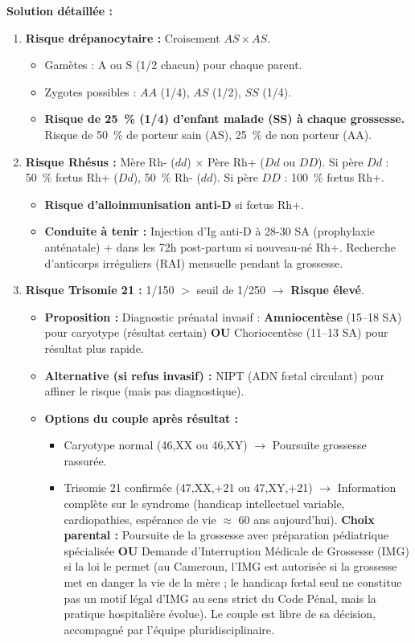 \documentclass[11pt]{article}
\begin{document}
\begin{exoresolu}
\textbf{Solution détaillée :}
\begin{enumerate}
    \item \textbf{Risque drépanocytaire :} Croisement $AS \times AS$.
    \begin{itemize}
        \item Gamètes : A ou S (1/2 chacun) pour chaque parent.
        \item Zygotes possibles : $AA$ (1/4), $AS$ (1/2), $SS$ (1/4).
        \item \textbf{Risque de \SI{25}{\%} (1/4) d'enfant malade (SS) à chaque grossesse.} Risque de \SI{50}{\%} de porteur sain (AS), \SI{25}{\%} de non porteur (AA).
    \end{itemize}
    \item \textbf{Risque Rhésus :} Mère Rh- ($dd$) $\times$ Père Rh+ ($Dd$ ou $DD$). Si père $Dd$ : \SI{50}{\%} fœtus Rh+ ($Dd$), \SI{50}{\%} Rh- ($dd$). Si père $DD$ : \SI{100}{\%} fœtus Rh+.
    \begin{itemize}
        \item \textbf{Risque d'alloinmunisation anti-D} si fœtus Rh+.
        \item \textbf{Conduite à tenir :} Injection d'Ig anti-D à \num{28}-\num{30} SA (prophylaxie anténatale) + dans les \num{72}h post-partum si nouveau-né Rh+. Recherche d'anticorps irréguliers (RAI) mensuelle pendant la grossesse.
    \end{itemize}
    \item \textbf{Risque Trisomie 21 :} 1/150 $>$ seuil de 1/250 $\rightarrow$ \textbf{Risque élevé}.
    \begin{itemize}
        \item \textbf{Proposition :} Diagnostic prénatal invasif : \textbf{Amniocentèse} (\num{15}--\num{18} SA) pour caryotype (résultat certain) \textbf{OU} Choriocentèse (\num{11}--\num{13} SA) pour résultat plus rapide.
        \item \textbf{Alternative (si refus invasif) :} NIPT (ADN fœtal circulant) pour affiner le risque (mais pas diagnostique).
        \item \textbf{Options du couple après résultat :}
        \begin{itemize}
            \item Caryotype normal (46,XX ou 46,XY) $\rightarrow$ Poursuite grossesse rassurée.
            \item Trisomie 21 confirmée (47,XX,+21 ou 47,XY,+21) $\rightarrow$ Information complète sur le syndrome (handicap intellectuel variable, cardiopathies, espérance de vie $\approx$ \num{60} ans aujourd'hui). \textbf{Choix parental :} Poursuite de la grossesse avec préparation pédiatrique spécialisée \textbf{OU} Demande d'Interruption Médicale de Grossesse (IMG) si la loi le permet (au Cameroun, l'IMG est autorisée si la grossesse met en danger la vie de la mère ; le handicap fœtal seul ne constitue pas un motif légal d'IMG au sens strict du Code Pénal, mais la pratique hospitalière évolue). Le couple est libre de sa décision, accompagné par l'équipe pluridisciplinaire.

\end{itemize}
\end{itemize}
\end{enumerate}
\end{exoresolu}
\end{document}
